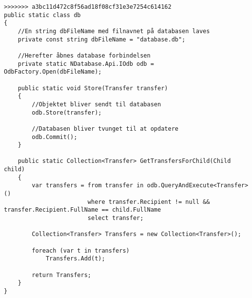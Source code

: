 \begin{lstlisting}[caption={Statisk klasse, der forbinder til objekt databasen NDatabase},label={lst:db}]
>>>>>>> a3bc11d472c8f56ad18f08cf31e3e7254c614162
public static class db
{
	//En string dbFileName med filnavnet på databasen laves
	private const string dbFileName = "database.db";
	
	//Herefter åbnes database forbindelsen
	private static NDatabase.Api.IOdb odb = OdbFactory.Open(dbFileName);

	public static void Store(Transfer transfer)
	{
		//Objektet bliver sendt til databasen
		odb.Store(transfer);
		
		//Databasen bliver tvunget til at opdatere
		odb.Commit();
	}
	
	public static Collection<Transfer> GetTransfersForChild(Child child)
	{
		var transfers = from transfer in odb.QueryAndExecute<Transfer>()
						where transfer.Recipient != null && transfer.Recipient.FullName == child.FullName
						select transfer;

		Collection<Transfer> Transfers = new Collection<Transfer>();

		foreach (var t in transfers)
			Transfers.Add(t);

		return Transfers;
	}
}
\end{lstlisting}

